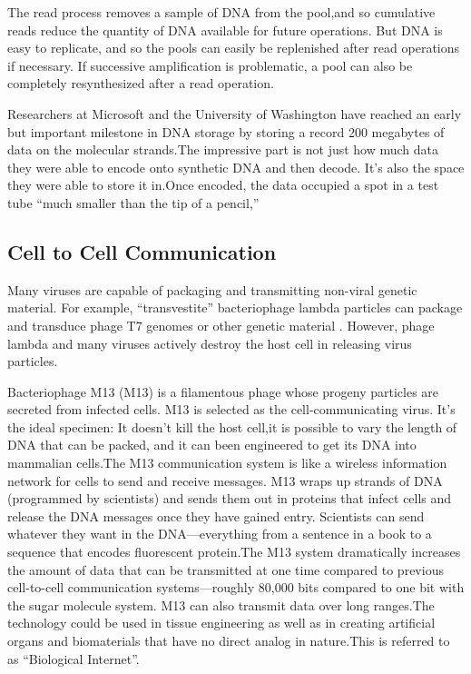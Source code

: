 \documentclass[a4paper]{article}
\begin{document}
The read process removes a sample of DNA from the pool,and so cumulative reads reduce the quantity of DNA available for future operations. But DNA is easy to replicate, and so the pools can easily be replenished after read operations if necessary. If successive amplification is problematic, a pool can also be completely resynthesized after a read operation.

Researchers at Microsoft and the University of Washington have reached an early but important milestone in DNA storage by storing a record 200 megabytes of data on the molecular strands.The impressive part is not just how much data they were able to encode onto synthetic DNA and then decode. It’s also the space they were able to store it in.Once encoded, the data occupied a spot in a test tube “much smaller than the tip of a pencil,”
\subsection{Cell to Cell Communication}

Many viruses are capable of packaging and transmitting non-viral genetic material. For example, “transvestite” bacteriophage lambda particles can package and transduce phage T7 genomes or other genetic material . However, phage lambda and many viruses actively destroy the host cell in releasing virus particles.

Bacteriophage M13 (M13) is a filamentous phage whose progeny particles are secreted from infected cells.
M13 is selected as the cell-communicating virus. It’s the ideal specimen: It doesn’t kill the host cell,it is possible to vary the length of DNA that can be packed, and it can been engineered to get its DNA into mammalian cells.The M13 communication system is like a wireless information network for cells to send and receive messages. M13 wraps up strands of DNA (programmed by scientists) and sends them out in proteins that infect cells and release the DNA messages once they have gained entry. Scientists can send whatever they want in the DNA—everything from a sentence in a book to a sequence that encodes fluorescent protein.The M13 system dramatically increases the amount of data that can be transmitted at one time compared to previous cell-to-cell communication systems—roughly 80,000 bits compared to one bit with the sugar molecule system. M13 can also transmit data over long ranges.The technology could be used in tissue engineering as well as in creating artificial organs and biomaterials that have no direct analog in nature.This is referred to as ``Biological Internet''.
\end{document}
